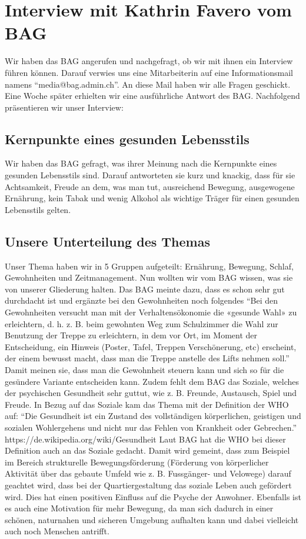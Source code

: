 \chapter{Interview mit Kathrin Favero vom BAG}
\authortoc{\bastian}{\chapterident}
Wir haben das BAG angerufen und nachgefragt, ob wir mit ihnen ein Interview führen können. Darauf verwies uns eine Mitarbeiterin auf eine Informationsmail namens “media@bag.admin.ch”. An diese Mail haben wir alle Fragen geschickt. Eine Woche später erhielten wir eine ausführliche Antwort des BAG. Nachfolgend präsentieren wir unser Interview:
\section{Kernpunkte eines gesunden Lebensstils}
Wir haben das BAG gefragt, was ihrer Meinung nach die Kernpunkte eines gesunden Lebensstils sind. Darauf antworteten sie kurz und knackig, dass für sie Achtsamkeit, Freude an dem, was man tut, ausreichend Bewegung, ausgewogene
Ernährung, kein Tabak und wenig Alkohol als wichtige Träger für einen gesunden Lebensstils gelten.
\section{Unsere Unterteilung des Themas}
Unser Thema haben wir in 5 Gruppen aufgeteilt: Ernährung, Bewegung, Schlaf, Gewohnheiten und Zeitmanagement. Nun wollten wir vom BAG wissen, was sie von unserer Gliederung halten. Das BAG meinte dazu, dass es schon sehr gut durchdacht ist und ergänzte bei den Gewohnheiten noch folgendes “Bei den Gewohnheiten versucht man mit der Verhaltensökonomie die «gesunde Wahl» zu erleichtern, d. h. z. B. beim gewohnten Weg zum Schulzimmer die Wahl zur Benutzung der Treppe zu erleichtern, in dem vor Ort, im Moment der Entscheidung, ein Hinweis (Poster, Tafel, Treppen Verschönerung, etc) erscheint, der einem bewusst macht, dass man die Treppe anstelle des Lifts nehmen soll.” Damit meinen sie, dass man die Gewohnheit steuern kann und sich so für die gesündere Variante entscheiden kann. Zudem fehlt dem BAG das Soziale, welches der psychischen Gesundheit sehr guttut, wie z. B. Freunde, Austausch, Spiel und Freude.
In Bezug auf das Soziale kam das Thema mit der Definition der WHO auf: “Die Gesundheit ist ein Zustand des vollständigen körperlichen, geistigen und sozialen Wohlergehens und nicht nur das Fehlen von Krankheit oder Gebrechen.” \cite{gesundheit_definition}
https://de.wikipedia.org/wiki/Gesundheit
Laut BAG hat die WHO bei dieser Definition auch an das Soziale gedacht. Damit wird gemeint, dass zum Beispiel im Bereich strukturelle Bewegungsförderung (Förderung von körperlicher Aktivität über das gebaute Umfeld wie z. B. Fussgänger- und Velowege) darauf geachtet wird, dass bei der Quartiergestaltung das soziale Leben auch gefördert wird. Dies hat einen positiven Einfluss auf die Psyche der Anwohner. Ebenfalls ist es auch eine Motivation für mehr Bewegung, da man sich dadurch in einer schönen, naturnahen und sicheren Umgebung aufhalten kann und dabei vielleicht auch noch Menschen antrifft.
